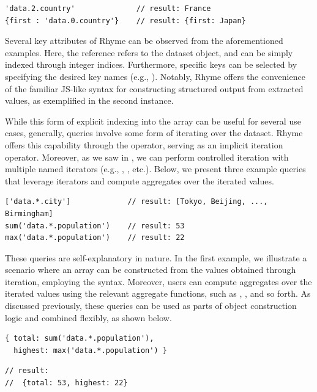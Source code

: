 \documentclass[runningheads]{llncs}
\newcommand{\lang}{Rhyme}
\begin{document}
\begin{lstlisting}[style=JavaScript]
'data.2.country'              // result: France
{first : 'data.0.country'}    // result: {first: Japan}
\end{lstlisting}

Several key attributes of \lang{} can be observed from the aforementioned examples.
Here, the reference  refers to
the dataset object, 
and can be simply indexed through integer indices.
Furthermore, specific keys can be selected by specifying the desired
key names (e.g., ).
Notably, \lang{} offers the convenience of the familiar JS-like syntax for constructing
structured output from extracted values, as exemplified in the second instance.

While this form of explicit indexing into the array can be useful for several
use cases, generally, queries involve some form of iterating over the dataset.
\lang{} offers this capability through the \inline{*} operator,
serving as an implicit iteration operator.
Moreover, as we saw in , we can perform controlled iteration with multiple
named iterators (e.g., , , etc.).
Below, we present three example queries that leverage iterators and compute
aggregates over the iterated values.

\begin{lstlisting}[style=JavaScript, columns=flexible]
['data.*.city']             // result: [Tokyo, Beijing, ..., Birmingham]
sum('data.*.population')    // result: 53
max('data.*.population')    // result: 22
\end{lstlisting}

These queries are self-explanatory in nature.
In the first example, we illustrate a scenario where an array can be constructed
from the values obtained through iteration, employing the \inline{[...]} syntax.
Moreover, users can compute aggregates over the iterated values using the
relevant aggregate functions, such as , , and so forth.
As discussed previously, these queries can be used as parts of object
construction logic and combined flexibly, as shown below.

\hspace{-18pt}
\begin{minipage}{0.5\textwidth}
\begin{lstlisting}[style=JavaScript, columns=flexible, numbers=none]
{ total: sum('data.*.population'), 
  highest: max('data.*.population') }
\end{lstlisting}
\end{minipage}%
\begin{minipage}{0.5\textwidth}
\begin{lstlisting}[style=JavaScript, columns=flexible, numbers=none]
// result: 
//  {total: 53, highest: 22}
\end{lstlisting}
\end{minipage}
\end{document}
